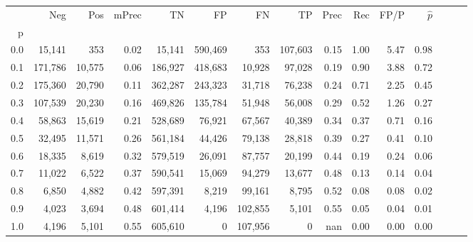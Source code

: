 \begin{tabular}{rrrrrrrrrrrrrrr}
\toprule
{} &      Neg &     Pos & mPrec &       TN &       FP &       FN &       TP &  Prec &   Rec &  FP/P & $\hat{p}$ \\
p   &          &         &       &          &          &          &          &       &       &       &           \\
\midrule
0.0 &   15,141 &     353 &  0.02 &   15,141 &  590,469 &      353 &  107,603 &  0.15 &  1.00 &  5.47 &      0.98 \\
0.1 &  171,786 &  10,575 &  0.06 &  186,927 &  418,683 &   10,928 &   97,028 &  0.19 &  0.90 &  3.88 &      0.72 \\
0.2 &  175,360 &  20,790 &  0.11 &  362,287 &  243,323 &   31,718 &   76,238 &  0.24 &  0.71 &  2.25 &      0.45 \\
0.3 &  107,539 &  20,230 &  0.16 &  469,826 &  135,784 &   51,948 &   56,008 &  0.29 &  0.52 &  1.26 &      0.27 \\
0.4 &   58,863 &  15,619 &  0.21 &  528,689 &   76,921 &   67,567 &   40,389 &  0.34 &  0.37 &  0.71 &      0.16 \\
0.5 &   32,495 &  11,571 &  0.26 &  561,184 &   44,426 &   79,138 &   28,818 &  0.39 &  0.27 &  0.41 &      0.10 \\
0.6 &   18,335 &   8,619 &  0.32 &  579,519 &   26,091 &   87,757 &   20,199 &  0.44 &  0.19 &  0.24 &      0.06 \\
0.7 &   11,022 &   6,522 &  0.37 &  590,541 &   15,069 &   94,279 &   13,677 &  0.48 &  0.13 &  0.14 &      0.04 \\
0.8 &    6,850 &   4,882 &  0.42 &  597,391 &    8,219 &   99,161 &    8,795 &  0.52 &  0.08 &  0.08 &      0.02 \\
0.9 &    4,023 &   3,694 &  0.48 &  601,414 &    4,196 &  102,855 &    5,101 &  0.55 &  0.05 &  0.04 &      0.01 \\
1.0 &    4,196 &   5,101 &  0.55 &  605,610 &        0 &  107,956 &        0 &   nan &  0.00 &  0.00 &      0.00 \\
\bottomrule
\end{tabular}
